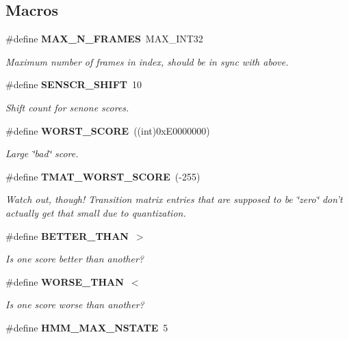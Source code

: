 \subsection*{Macros}
\begin{DoxyCompactItemize}
\item 
\#define {\bf M\-A\-X\-\_\-\-N\-\_\-\-F\-R\-A\-M\-E\-S}~M\-A\-X\-\_\-\-I\-N\-T32\label{hmm_8h_a5b6b9157cfaaec312508eaed602f0698}

\begin{DoxyCompactList}\small\item\em Maximum number of frames in index, should be in sync with above. \end{DoxyCompactList}\item 
\#define {\bf S\-E\-N\-S\-C\-R\-\_\-\-S\-H\-I\-F\-T}~10
\begin{DoxyCompactList}\small\item\em Shift count for senone scores. \end{DoxyCompactList}\item 
\#define {\bf W\-O\-R\-S\-T\-\_\-\-S\-C\-O\-R\-E}~((int)0x\-E0000000)
\begin{DoxyCompactList}\small\item\em Large \char`\"{}bad\char`\"{} score. \end{DoxyCompactList}\item 
\#define {\bf T\-M\-A\-T\-\_\-\-W\-O\-R\-S\-T\-\_\-\-S\-C\-O\-R\-E}~(-\/255)\label{hmm_8h_a9b38399b544dbb93bc9b7d0094e91db7}

\begin{DoxyCompactList}\small\item\em Watch out, though! Transition matrix entries that are supposed to be \char`\"{}zero\char`\"{} don't actually get that small due to quantization. \end{DoxyCompactList}\item 
\#define {\bf B\-E\-T\-T\-E\-R\-\_\-\-T\-H\-A\-N}~$>$\label{hmm_8h_a2874ab52613ff781c96f570ec0eb0d98}

\begin{DoxyCompactList}\small\item\em Is one score better than another? \end{DoxyCompactList}\item 
\#define {\bf W\-O\-R\-S\-E\-\_\-\-T\-H\-A\-N}~$<$\label{hmm_8h_aa930fb8fb6fce7f34bcf4018b81d7066}

\begin{DoxyCompactList}\small\item\em Is one score worse than another? \end{DoxyCompactList}\item 
\#define {\bf H\-M\-M\-\_\-\-M\-A\-X\-\_\-\-N\-S\-T\-A\-T\-E}~5\label{hmm_8h_a1eb055ab0e55008f27d78e7b07a55a1c}


\end{DoxyCompactItemize}
